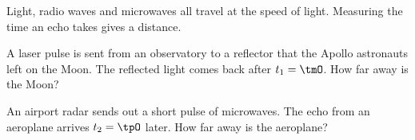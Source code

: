 Light, radio waves and microwaves all travel at the speed of light. Measuring the time an echo takes gives a distance.

\begin{abcliste}
\abc A laser pulse is sent from an observatory to a reflector that the Apollo astronauts left on the Moon. The reflected light comes back after $t_1 = \tmO$. How far away is the Moon?

\abc An airport radar sends out a short pulse of microwaves. The echo from an aeroplane arrives $t_2 = \tpO$ later. How far away is the aeroplane?
\end{abcliste}
